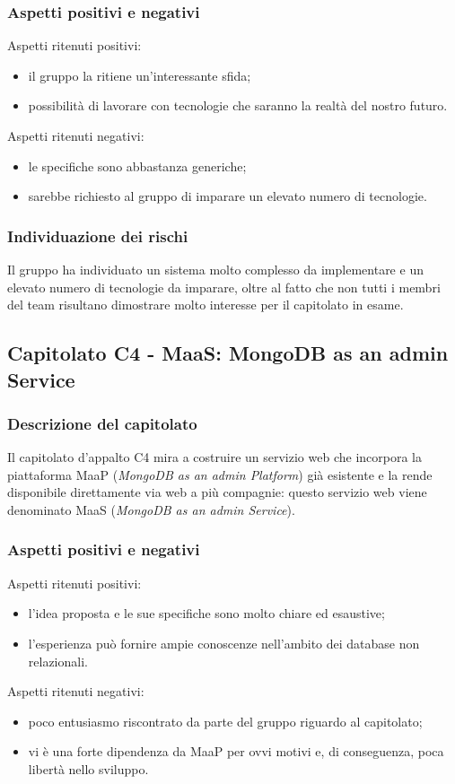 \documentclass[../nStudioDiFattibilita.tex]{subfiles}
\begin{document}
		\subsubsection{Aspetti positivi e negativi}
		Aspetti ritenuti positivi:
			\begin{itemize}
				\item il gruppo la ritiene un'interessante sfida;
				\item possibilità di lavorare con tecnologie che saranno la realtà del nostro futuro.
			\end{itemize}
		Aspetti ritenuti negativi:
			\begin{itemize}
				\item le specifiche sono abbastanza generiche;
				\item sarebbe richiesto al gruppo di imparare un elevato numero di tecnologie.
			\end{itemize}
		\subsubsection{Individuazione dei rischi}
		Il gruppo ha individuato un sistema molto complesso da implementare e un elevato numero di tecnologie da imparare, oltre al fatto che non tutti i membri del team risultano dimostrare molto interesse per il capitolato in esame.
	\subsection{Capitolato C4 - MaaS: MongoDB as an admin Service}
		\subsubsection{Descrizione del capitolato}
		Il capitolato d'appalto C4 mira a costruire un servizio web che incorpora la piattaforma MaaP (\textit{MongoDB as an admin Platform}) già esistente e la rende disponibile direttamente via web a più compagnie: questo servizio web viene denominato MaaS (\textit{MongoDB as an admin Service}).
		\subsubsection{Aspetti positivi e negativi}
		Aspetti ritenuti positivi:
			\begin{itemize}
				\item l'idea proposta e le sue specifiche sono molto chiare ed esaustive;
				\item l'esperienza può fornire ampie conoscenze nell'ambito dei database non relazionali.
			\end{itemize}
		Aspetti ritenuti negativi:
			\begin{itemize}
				\item poco entusiasmo riscontrato da parte del gruppo riguardo al capitolato;
				\item vi è una forte dipendenza da MaaP per ovvi motivi e, di conseguenza, poca libertà nello sviluppo.
			\end{itemize}
\end{document}
